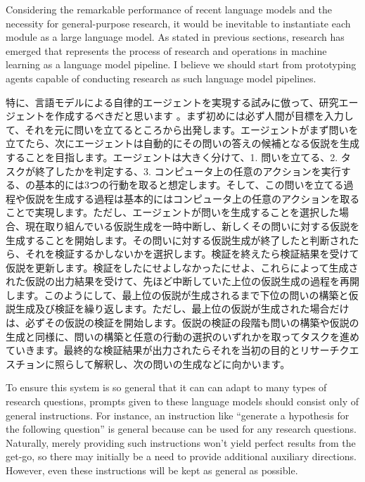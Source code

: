 Considering the remarkable performance of recent language models and the necessity for general-purpose research, it would be inevitable to instantiate each module as a large language model. As stated in previous sections, research has emerged that represents the process of research \cite{boiko2023emergent} and operations in machine learning \cite{viswanathan2023prompt2model} as a language model pipeline. I believe we should start from prototyping agents capable of conducting research as such language model pipelines.

特に、言語モデルによる自律的エージェントを実現する試みに倣って、研究エージェントを作成するべきだと思います \cite{wang2023survey,xi2023rise}。まず初めには必ず人間が目標を入力して、それを元に問いを立てるところから出発します。エージェントがまず問いを立てたら、次にエージェントは自動的にその問いの答えの候補となる仮説を生成することを目指します。エージェントは大きく分けて、1. 問いを立てる、2. タスクが終了したかを判定する、3. コンピュータ上の任意のアクションを実行する、の基本的には3つの行動を取ると想定します。そして、この問いを立てる過程や仮説を生成する過程は基本的にはコンピュータ上の任意のアクションを取ることで実現します。ただし、エージェントが問いを生成することを選択した場合、現在取り組んでいる仮説生成を一時中断し、新しくその問いに対する仮説を生成することを開始します。その問いに対する仮説生成が終了したと判断されたら、それを検証するかしないかを選択します。検証を終えたら検証結果を受けて仮説を更新します。検証をしたにせよしなかったにせよ、これらによって生成された仮説の出力結果を受けて、先ほど中断していた上位の仮説生成の過程を再開します。このようにして、最上位の仮説が生成されるまで下位の問いの構築と仮説生成及び検証を繰り返します。ただし、最上位の仮説が生成された場合だけは、必ずその仮説の検証を開始します。仮説の検証の段階も問いの構築や仮説の生成と同様に、問いの構築と任意の行動の選択のいずれかを取ってタスクを進めていきます。最終的な検証結果が出力されたらそれを当初の目的とリサーチクエスチョンに照らして解釈し、次の問いの生成などに向かいます。

To ensure this system is so general that it can can adapt to many types of research questions, prompts given to these language models should consist only of general instructions. For instance, an instruction like ``generate a hypothesis for the following question'' is general because can be used for any research questions. Naturally, merely providing such instructions won't yield perfect results from the get-go, so there may initially be a need to provide additional auxiliary directions. However, even these instructions will be kept as general as possible.

